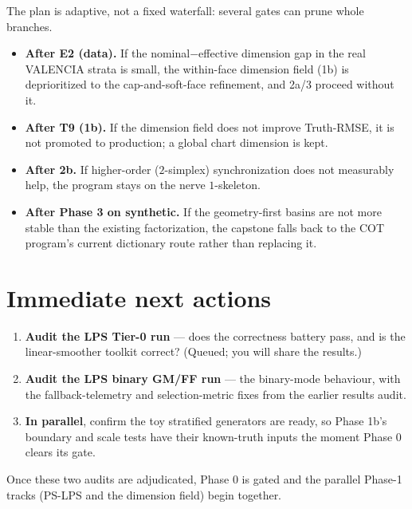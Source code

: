 \documentclass[11pt]{article}
\begin{document}
The plan is adaptive, not a fixed waterfall: several gates can prune whole branches.

\begin{itemize}[leftmargin=1.4em]
\item \textbf{After E2 (data).} If the nominal$-$effective dimension gap in the real
VALENCIA strata is small, the within-face dimension field (1b) is deprioritized to
the cap-and-soft-face refinement, and 2a/3 proceed without it.
\item \textbf{After T9 (1b).} If the dimension field does not improve Truth-RMSE, it
is not promoted to production; a global chart dimension is kept.
\item \textbf{After 2b.} If higher-order ($2$-simplex) synchronization does not
measurably help, the program stays on the nerve $1$-skeleton.
\item \textbf{After Phase 3 on synthetic.} If the geometry-first basins are not more
stable than the existing factorization, the capstone falls back to the COT
program's current dictionary route rather than replacing it.
\end{itemize}

\section{Immediate next actions}\label{sec:next}

\begin{enumerate}[leftmargin=1.6em]
\item \textbf{Audit the LPS Tier-0 run} --- does the correctness battery pass, and
is the linear-smoother toolkit correct? (Queued; you will share the results.)
\item \textbf{Audit the LPS binary GM/FF run} --- the binary-mode behaviour, with the
fallback-telemetry and selection-metric fixes from the earlier results audit.
\item \textbf{In parallel}, confirm the toy stratified generators are ready, so
Phase 1b's boundary and scale tests have their known-truth inputs the moment Phase 0
clears its gate.
\end{enumerate}

Once these two audits are adjudicated, Phase 0 is gated and the parallel Phase-1
tracks (PS-LPS and the dimension field) begin together.
\end{document}
